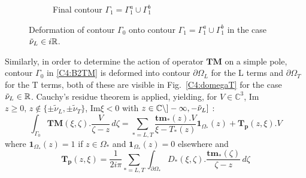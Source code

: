 \begin{figure}
\begin{subfigure}[b]{0.45\textwidth}
\caption{Final contour $\Gamma_1=\Gamma_1^a \cup \Gamma_1^b$}
\end{subfigure}
\caption{Deformation of contour $\Gamma_0$ onto contour $\Gamma_1=\Gamma_1^a \cup \Gamma_1^b$ in the case $\tilde{\nu}_L \in i\mathbb{R}$.}
\label{C4:gamma1cr}
\end{figure}

Similarly, in order to determine the action of operator $\mathbf{TM}$ on a simple pole, contour $\Gamma_0$ in \eqref{C4:B2TM} is deformed into contour $\partial \Omega_L$ for the L terms and $\partial \Omega_T$ for the T terms, both of these are visible in Fig.~\ref{C4:domegaT} for the case $\tilde{\nu}_L \in \mathbb{R}$. Cauchy's residue theorem is applied, yielding, for $V \in \mathbb{C}^3$, Im$z\geq 0, \, z \notin \{\pm\tilde{\nu}_L,\pm\tilde{\nu}_T \}$, Im$\xi <0 $ with $z\in \mathbb{C} \backslash  \rbrack - \infty, -\tilde{\nu}_L \rbrack$ :
\begin{equation}
\int_{\Gamma_0} \textbf{TM}(\xi,\zeta).\frac{V}{\zeta-z}\,d\zeta = \sum_{*=L,T} \frac{\textbf{tm}_*(z).V}{\xi-T_*(z)}\textbf{1}_{\Omega_*}(z)+\mathbf{T_p}(z,\xi).V
\label{C4:GaussTM}
\end{equation}
where $\textbf{1}_{\Omega_*}(z)=1$ if $z\in \Omega_*$ and $\textbf{1}_{\Omega_*}(z)=0$ elsewhere and
\begin{equation}
\mathbf{T_p}(z,\xi)= \frac{1}{2i\pi} \sum_{*=L,T} \int_{\partial \Omega_*} D_*(\xi,\zeta) .\dfrac{\textbf{tm}_*(\zeta)}{\zeta-z}\, d\zeta
\label{C4:defTp}
\end{equation}

